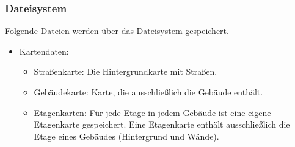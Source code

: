 \subsubsection{Dateisystem}
Folgende Dateien werden über das Dateisystem gespeichert.
\begin{itemize}
    \item Kartendaten:
    \begin{itemize}
        \item Straßenkarte: Die Hintergrundkarte mit Straßen.
        \item Gebäudekarte: Karte, die ausschließlich die Gebäude enthält.
        \item Etagenkarten: Für jede Etage in jedem Gebäude ist eine eigene Etagenkarte gespeichert. 
        Eine Etagenkarte enthält ausschließlich die Etage eines Gebäudes (Hintergrund und Wände).
    \end{itemize}
\end{itemize}